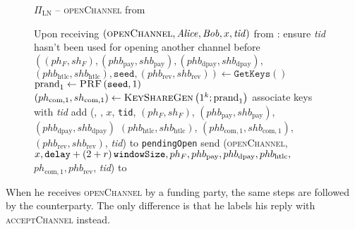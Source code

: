   \begin{figure}[H]
    \begin{protocolbox}{$\Pi_{\mathrm{LN}}$ -- \textsc{openChannel} from
    \environment}
      \begin{algorithmic}[1]
        \State Upon receiving $\left(\textsc{openChannel}, \mathit{Alice}, \mathit{Bob}, x,
        \mathit{tid}\right)$ from \environment:
        \Indent
          \State ensure \textit{tid} hasn't been used for opening another
          channel before
          \label{alg:protocol:open:env:valid}
          \State $\left(\left(ph_F, sh_F\right), \left(phb_{\mathrm{pay}},
          shb_{\mathrm{pay}}\right), \left(phb_{\mathrm{dpay}},
          shb_{\mathrm{dpay}}\right),\right.$ $\left.\left(phb_{\mathrm{htlc}},
          shb_{\mathrm{htlc}}\right), \mathtt{seed}, \left(phb_{\mathrm{rev}},
          shb_{\mathrm{rev}}\right)\right) \gets \texttt{GetKeys}\left(\right)$
          \State $\mathrm{prand}_1 \gets \textsc{PRF}\left(\mathtt{seed},
          1\right)$
          \label{alg:protocol:open:env:prf}
          \State $\left(ph_{\mathrm{com}, 1}, sh_{\mathrm{com}, 1}\right) \gets
          \textsc{KeyShareGen}\left(1^k; \mathrm{prand}_1\right)$
          \State associate keys with \textit{tid}
          \State add (\alice, \bob, $x$, \texttt{tid}, $(ph_F, sh_F)$,
          $(phb_{\mathrm{pay}}, shb_{\mathrm{pay}})$, $(phb_{\mathrm{dpay}},
          shb_{\mathrm{dpay}})$ $(phb_{\mathrm{htlc}}, shb_{\mathrm{htlc}})$,
          $(phb_{\mathrm{com}, 1}, shb_{\mathrm{com}, 1})$,
          $(phb_{\mathrm{rev}}, shb_{\mathrm{rev}})$, \textit{tid}) to
          \texttt{pendingOpen}
          \label{alg:protocol:open:env:pendingOpen}
          \State send (\textsc{openChannel}, $x, \mathtt{delay} + \left(2 + r\right)\texttt{windowSize},
          ph_F, phb_{\mathrm{pay}}, phb_{\mathrm{dpay}}, phb_{\mathrm{htlc}},$
          $ph_{\mathrm{com}, 1}, phb_{\mathrm{rev}}$, \textit{tid}) to \bob{}
        \EndIndent
      \end{algorithmic}
    \end{protocolbox}
    \caption{}
    \label{alg:protocol:open:env}
  \end{figure}

  When he receives \textsc{openChannel} by a funding party, the same steps are
  followed by the counterparty. The only difference is that he labels his reply
  with \textsc{acceptChannel} instead.


